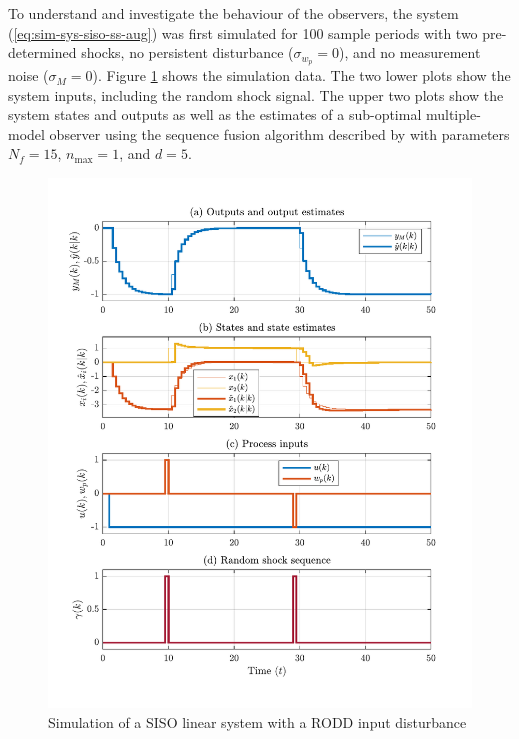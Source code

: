 To understand and investigate the behaviour of the observers, the system (\ref{eq:sim-sys-siso-ss-aug}) was first simulated for 100 sample periods with two pre-determined shocks, no persistent disturbance ($\sigma_{w_p}=0$), and no measurement noise ($\sigma_M=0$). Figure \ref{fig:rod-obs-sim-test-ioplot-SF95} shows the simulation data. The two lower plots show the system inputs, including the random shock signal. The upper two plots show the system states and outputs as well as the estimates of a sub-optimal multiple-model observer using the sequence fusion algorithm described by \cite{robertson_detection_1995} with parameters $N_f=15$, $n_\text{max}=1$, and $d=5$.
\begin{figure}[htp]
	\centering
	\includegraphics[width=13cm]{images/rod_MKF_SF_test_sim_MKF_SF95_ioplot.pdf}
	\caption{Simulation of a SISO linear system with a \gls{RODD} input disturbance}
	\label{fig:rod-obs-sim-test-ioplot-SF95}
\end{figure}

